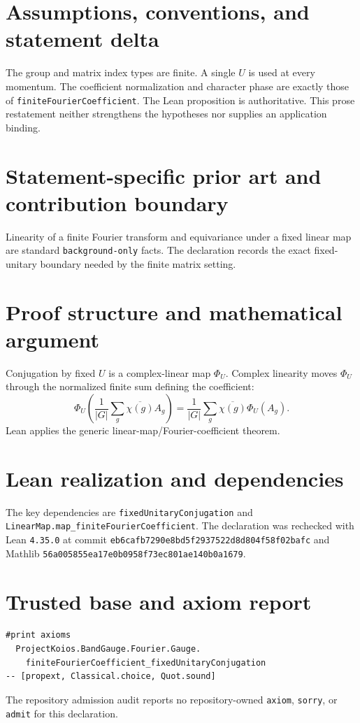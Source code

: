 \documentclass[11pt]{article}
\begin{document}
\section{Assumptions, conventions, and statement delta}
The group and matrix index types are finite.  A single $U$ is used at every momentum.  The coefficient normalization and character phase are exactly those of \texttt{finiteFourierCoefficient}.
The Lean proposition is authoritative.  This prose restatement neither strengthens the hypotheses
nor supplies an application binding.

\section{Statement-specific prior art and contribution boundary}
Linearity of a finite Fourier transform and equivariance under a fixed linear map are standard \texttt{background-only} facts.  The declaration records the exact fixed-unitary boundary needed by the finite matrix setting.

\section{Proof structure and mathematical argument}
Conjugation by fixed $U$ is a complex-linear map $\Phi_U$.  Complex linearity moves $\Phi_U$ through the normalized finite sum defining the coefficient:
\[
 \Phi_U\!\left(\frac1{|G|}\sum_g \overline{\chi(g)}A_g\right)
 =\frac1{|G|}\sum_g\overline{\chi(g)}\Phi_U(A_g).
\]
Lean applies the generic linear-map/Fourier-coefficient theorem.

\section{Lean realization and dependencies}
The key dependencies are \texttt{fixedUnitaryConjugation} and \texttt{LinearMap.map\_finiteFourierCoefficient}.  The declaration was rechecked with Lean \texttt{4.35.0} at commit \texttt{eb6cafb7290e8bd5f2937522d8d804f58f02bafc} and Mathlib \texttt{56a005855ea17e0b0958f73ec801ae140b0a1679}.

\section{Trusted base and axiom report}
\begin{verbatim}
#print axioms
  ProjectKoios.BandGauge.Fourier.Gauge.
    finiteFourierCoefficient_fixedUnitaryConjugation
-- [propext, Classical.choice, Quot.sound]
\end{verbatim}
The repository admission audit reports no repository-owned \texttt{axiom}, \texttt{sorry}, or
\texttt{admit} for this declaration.
\end{document}
